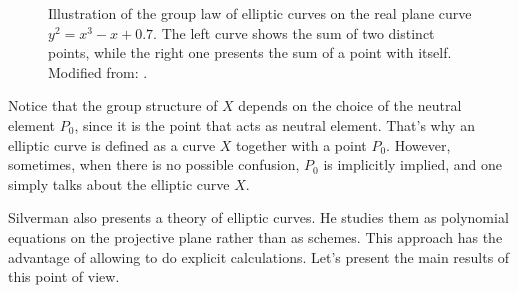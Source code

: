 \documentclass{report}
\theoremstyle{definition}
\begin{document}
\begin{figure}[!ht]
\begin{center}

\caption{Illustration of the group law of elliptic curves on the real plane curve $y^2=x^3-x+0.7$. The left curve shows the sum of two distinct points, while the right one presents the sum of a point with itself. Modified from: \cite[Figure~3.3]{silverman2009arithmetic}.}
\label{fig:group-law}
\end{center}
\end{figure}

Notice that the group structure of $X$ depends on the choice of the neutral element $P_0$, since it is the point that acts as neutral element. That's why an elliptic curve is defined as a curve $X$ together with a point $P_0$. However, sometimes, when there is no possible confusion, $P_0$ is implicitly implied, and one simply talks about the elliptic curve $X$.
\vspace{2mm}

Silverman \cite[Chapter~III]{silverman2009arithmetic} also presents a theory of elliptic curves. He studies them as polynomial equations on the projective plane rather than as schemes. This approach has the advantage of allowing to do explicit calculations. Let's present the main results of this point of view.
\end{document}
